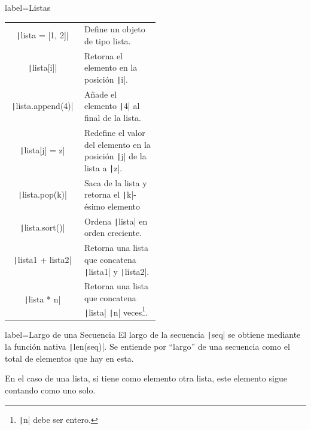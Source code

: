 \begin{contentbox}{label=Listas}
    \begin{tabular}{C|p{0.5\linewidth}}
        \texttt|lista = [1, 2]| & Define un objeto de tipo lista. \\
        \texttt|lista[i]| & Retorna el elemento en la posición \texttt|i|. \\
        \texttt|lista.append(4)| & Añade el elemento \texttt|4| al final de la lista. \\
        \texttt|lista[j] = z| & Redefine el valor del elemento en la posición \texttt|j| de la lista a \texttt|z|. \\
        \texttt|lista.pop(k)| & Saca de la lista y retorna el \texttt|k|-ésimo elemento \\
        \texttt|lista.sort()| & Ordena \texttt|lista| en orden creciente. \\
        \texttt|lista1 + lista2| & Retorna una lista que concatena \texttt|lista1| y \texttt|lista2|. \\
        \texttt|lista * n| & Retorna una lista que concatena \texttt|lista| \texttt|n| veces\footnote{\texttt|n| debe ser entero.}. \\
    \end{tabular}
\end{contentbox}

\begin{contentbox}{label=Largo de una Secuencia}
    El largo de la secuencia \texttt|seq| se obtiene mediante la función nativa \texttt|len(seq)|. Se entiende por ``largo'' de una secuencia como el total de elementos que hay en esta.
    
    En el caso de una lista, si tiene como elemento otra lista, este elemento sigue contando como uno solo.
\end{contentbox}


